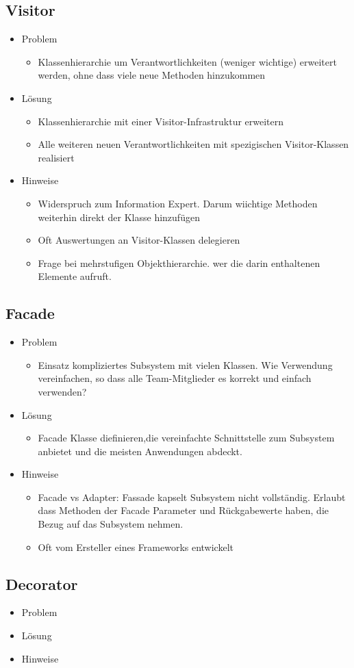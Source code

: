 \documentclass[../ZF_SWEN1.tex]{subfiles}
\begin{document}
\subsection{Visitor}
\begin{itemize}
	\item Problem
	\begin{itemize}
		\item Klassenhierarchie um Verantwortlichkeiten (weniger wichtige) erweitert werden, ohne dass viele neue Methoden hinzukommen
	\end{itemize}
	\item Lösung
	\begin{itemize}
		\item Klassenhierarchie mit einer Visitor-Infrastruktur erweitern
		\item Alle weiteren neuen Verantwortlichkeiten mit spezigischen Visitor-Klassen realisiert
	\end{itemize}
	\item Hinweise
	\begin{itemize}
		\item Widerspruch zum Information Expert. Darum wiichtige Methoden weiterhin direkt der Klasse hinzufügen
		\item Oft Auswertungen an Visitor-Klassen delegieren
		\item Frage bei mehrstufigen Objekthierarchie. wer die darin enthaltenen Elemente aufruft.
	\end{itemize}
\end{itemize}



\subsection{Facade}
\begin{itemize}
	\item Problem
	\begin{itemize}
		\item Einsatz kompliziertes Subsystem mit vielen Klassen. Wie Verwendung vereinfachen, so dass alle Team-Mitglieder es korrekt und einfach verwenden?
	\end{itemize}
	\item Lösung
	\begin{itemize}
		\item Facade Klasse diefinieren,die vereinfachte Schnittstelle zum Subsystem anbietet und die meisten Anwendungen abdeckt.
	\end{itemize}
	\item Hinweise
	\begin{itemize}
		\item Facade vs Adapter: Fassade kapselt Subsystem nicht vollständig. Erlaubt dass Methoden der Facade Parameter und Rückgabewerte haben, die Bezug auf das Subsystem nehmen.
		\item Oft vom Ersteller eines Frameworks entwickelt
	\end{itemize}
\end{itemize}



\subsection{Decorator}
\begin{itemize}
	\item Problem
	\item Lösung
	\item Hinweise
\end{itemize}
\end{document}
